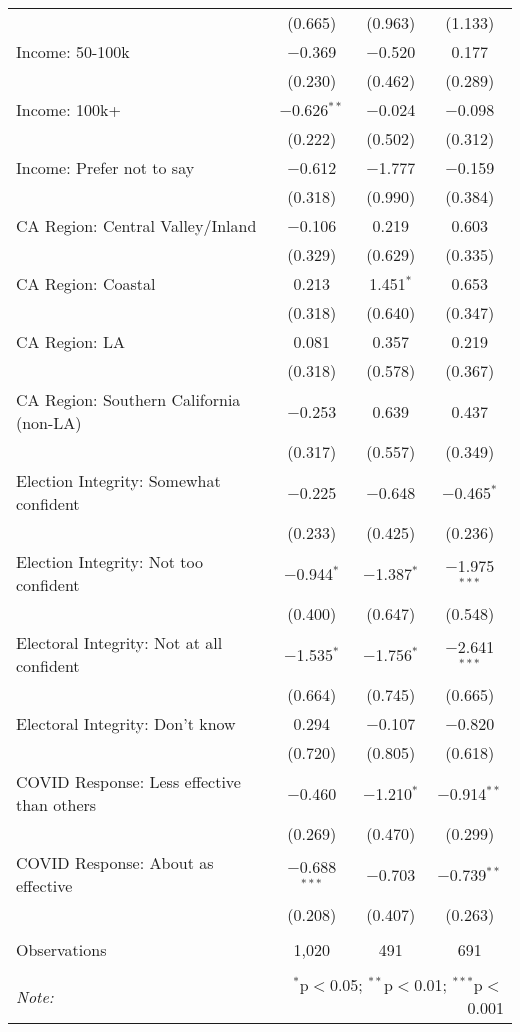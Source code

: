 \begin{table}[!htbp]
\begin{tabular}{@{\extracolsep{5pt}}lccc}
  & (0.665) & (0.963) & (1.133) \\ 
  Income: 50-100k & $-$0.369 & $-$0.520 & 0.177 \\ 
  & (0.230) & (0.462) & (0.289) \\ 
  Income: 100k+ & $-$0.626$^{**}$ & $-$0.024 & $-$0.098 \\ 
  & (0.222) & (0.502) & (0.312) \\ 
  Income: Prefer not to say & $-$0.612 & $-$1.777 & $-$0.159 \\ 
  & (0.318) & (0.990) & (0.384) \\ 
  CA Region: Central Valley/Inland & $-$0.106 & 0.219 & 0.603 \\ 
  & (0.329) & (0.629) & (0.335) \\ 
  CA Region: Coastal & 0.213 & 1.451$^{*}$ & 0.653 \\ 
  & (0.318) & (0.640) & (0.347) \\ 
  CA Region: LA & 0.081 & 0.357 & 0.219 \\ 
  & (0.318) & (0.578) & (0.367) \\ 
  CA Region: Southern California (non-LA) & $-$0.253 & 0.639 & 0.437 \\ 
  & (0.317) & (0.557) & (0.349) \\ 
  Election Integrity: Somewhat confident & $-$0.225 & $-$0.648 & $-$0.465$^{*}$ \\ 
  & (0.233) & (0.425) & (0.236) \\ 
  Election Integrity: Not too confident & $-$0.944$^{*}$ & $-$1.387$^{*}$ & $-$1.975$^{***}$ \\ 
  & (0.400) & (0.647) & (0.548) \\ 
  Electoral Integrity: Not at all confident & $-$1.535$^{*}$ & $-$1.756$^{*}$ & $-$2.641$^{***}$ \\ 
  & (0.664) & (0.745) & (0.665) \\ 
  Electoral Integrity: Don't know & 0.294 & $-$0.107 & $-$0.820 \\ 
  & (0.720) & (0.805) & (0.618) \\ 
  COVID Response: Less effective than others & $-$0.460 & $-$1.210$^{*}$ & $-$0.914$^{**}$ \\ 
  & (0.269) & (0.470) & (0.299) \\ 
  COVID Response: About as effective & $-$0.688$^{***}$ & $-$0.703 & $-$0.739$^{**}$ \\ 
  & (0.208) & (0.407) & (0.263) \\ 
 \hline \\[-1.8ex] 
Observations & 1,020 & 491 & 691 \\ 
\hline 
\hline \\[-1.8ex] 
\textit{Note:}  & \multicolumn{3}{r}{$^{*}$p$<$0.05; $^{**}$p$<$0.01; $^{***}$p$<$0.001} \\ 
\end{tabular} 
\end{table} 
